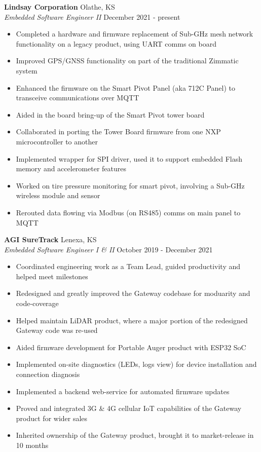 \documentclass[a4paper]{article}
\begin{document}
\textbf{Lindsay Corporation} \hfill Olathe, KS\\
\textit{Embedded Software Engineer II} \hfill December 2021 - present\\
\vspace{-1mm}
\begin{itemize} \itemsep 1pt
\item Completed a hardware and firmware replacement of Sub-GHz mesh network functionality on a legacy product, using UART comms on board
\item Improved GPS/GNSS functionality on part of the traditional Zimmatic system
\item Enhanced the firmware on the Smart Pivot Panel (aka 712C Panel) to transceive communications over MQTT
\item Aided in the board bring-up of the Smart Pivot tower board
\item Collaborated in porting the Tower Board firmware from one NXP microcontroller to another
\item Implemented wrapper for SPI driver, used it to support embedded Flash memory and accelerometer features
\item Worked on tire pressure monitoring for smart pivot, involving a Sub-GHz wireless module and sensor
\item Rerouted data flowing via Modbus (on RS485) comms on main panel to MQTT
\end{itemize}
\textbf{AGI SureTrack} \hfill Lenexa, KS\\
\textit{Embedded Software Engineer I \& II} \hfill October 2019 - December 2021\\
\vspace{-1mm}
\begin{itemize} \itemsep 1pt
	\item Coordinated engineering work as a Team Lead, guided productivity and helped meet milestones
	\item Redesigned and greatly improved the Gateway codebase for moduarity and code-coverage
	\item Helped maintain LiDAR product, where a major portion of the redesigned Gateway code was re-used
	\item Aided firmware development for Portable Auger product with ESP32 SoC
	\item Implemented on-site diagnostics (LEDs, logs view) for device installation and connection diagnosis
	\item Implemented a backend web-service for automated firmware updates
	\item Proved and integrated 3G \& 4G cellular IoT capabilities of the Gateway product for wider sales
	\item Inherited ownership of the Gateway product, brought it to market-release in 10 months
\end{itemize}
\end{document}
